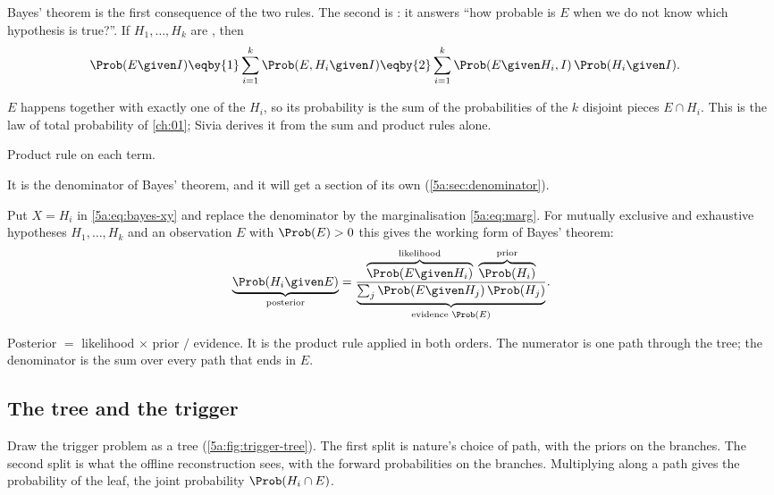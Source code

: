 Bayes' theorem is the first consequence of the two rules. The second is
 : it answers ``how
probable is $E$ when we do not know which hypothesis is true?''. If $H_1,\dots,H_k$ are  , then
\begin{align}
  \Prob(E\given I)
  &\eqby{1}\sum_{i=1}^k\Prob(E,H_i\given I)
  \eqby{2}\sum_{i=1}^k\Prob(E\given H_i,I)\,\Prob(H_i\given I) .
  \label{5a:eq:marg}
\end{align}
\begin{explain}
  \item $E$ happens together with exactly one of the $H_i$, so its probability
        is the sum of the probabilities of the $k$ disjoint pieces $E\cap H_i$.
        This is the law of total probability of \cref{ch:01}; Sivia derives it
        from the sum and product rules alone.
  \item Product rule on each term.
\end{explain}
It is the denominator of Bayes' theorem, and it will get a section of its own
(\cref{5a:sec:denominator}).

Put $X=H_i$ in \eqref{5a:eq:bayes-xy} and replace the denominator by the
marginalisation \eqref{5a:eq:marg}. For mutually exclusive and exhaustive hypotheses
$H_1,\dots,H_k$ and an observation $E$ with $\Prob(E)>0$ this gives the working form
of Bayes' theorem:
\begin{equation}
  \underbrace{\Prob(H_i\given E)}_{\text{posterior}}
  =\frac{\overbrace{\Prob(E\given H_i)}^{\text{likelihood}}\;
         \overbrace{\Prob(H_i)}^{\text{prior}}}
        {\underbrace{\textstyle\sum_{j}\Prob(E\given H_j)\,\Prob(H_j)}_{\text{evidence }\Prob(E)}} .
  \label{5a:eq:bayes}
\end{equation}

\begin{keyidea}
Posterior $=$ likelihood $\times$ prior $/$ evidence. It is the product rule applied in
both orders. The numerator is one path through the tree; the denominator is the sum
over every path that ends in $E$.
\end{keyidea}

\subsection{The tree and the trigger}

Draw the trigger problem as a tree (\cref{5a:fig:trigger-tree}). The first split
is nature's choice of path, with the priors on the branches. The second split is
what the offline reconstruction sees, with the forward probabilities on the
branches. Multiplying along a path gives the probability of the leaf, the joint
probability $\Prob(H_i\cap E)$.

